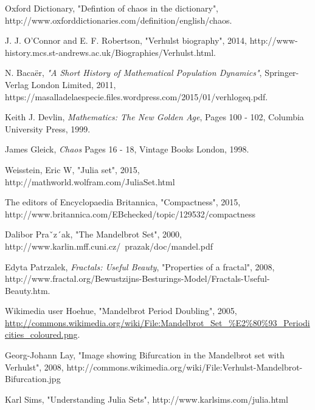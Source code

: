 \documentclass[a4wide, 10pt]{article}
\begin{document}
\begin{thebibliography}{20}

  Oxford Dictionary, 
  "Defintion of chaos in the dictionary",
  http://www.oxforddictionaries.com/definition/english/chaos.
  
  J. J. O'Connor and E. F. Robertson, 
  "Verhulst biography", 
  2014, 
  http://www-history.mcs.st-andrews.ac.uk/Biographies/Verhulst.html.
  
  N. Baca\"er, 
  \emph{"A Short History of Mathematical Population Dynamics"}, 
  Springer-Verlag London Limited, 
  2011, 
  https://masalladelaespecie.files.wordpress.com/2015/01/verhlogeq.pdf.
  
  Keith J. Devlin, 
  \emph{Mathematics: The New Golden Age}, 
  Pages 100 - 102, 
  Columbia University Press, 
  1999.
  
  James Gleick, 
  \emph{Chaos}
  Pages 16 - 18, 
  Vintage Books London, 
  1998.

Weisstein, Eric W,
"Julia set",
 2015,
 http://mathworld.wolfram.com/JuliaSet.html

  The editors of Encyclopaedia Britannica,
  "Compactness",
  2015,
 http://www.britannica.com/EBchecked/topic/129532/compactness

 Dalibor Praˇz´ak,
 "The Mandelbrot Set",
 2000,
 http://www.karlin.mff.cuni.cz/~prazak/doc/mandel.pdf

  Edyta Patrzalek, 
  \emph{Fractals: Useful Beauty}, 
  "Properties of a fractal", 
  2008, 
  http://www.fractal.org/Bewustzijns-Besturings-Model/Fractals-Useful-Beauty.htm.

  Wikimedia user Hoehue,
  "Mandelbrot Period Doubling",
  2005, 
  \url{http://commons.wikimedia.org/wiki/File:Mandelbrot_Set_%E2%80%93_Periodicities_coloured.png}.
  
  Georg-Johann Lay,
  "Image showing Bifurcation in the Mandelbrot set with Verhulst",
  2008, 
  http://commons.wikimedia.org/wiki/File:Verhulst-Mandelbrot-Bifurcation.jpg
  
  Karl Sims,
  "Understanding Julia Sets", 
  http://www.karlsims.com/julia.html
  

\end{thebibliography}
\end{document}
